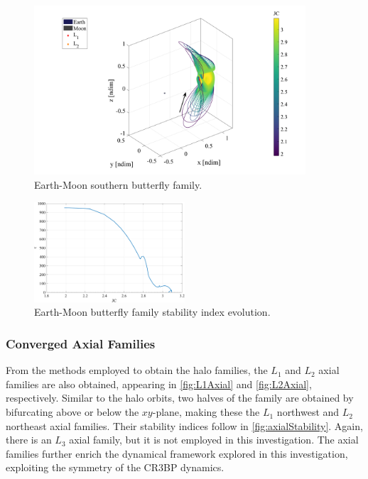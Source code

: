 \begin{figure}[H]
    \centering
    \includegraphics[width=0.9\textwidth]{figures/L2ButterflyFamily.pdf}
    \caption{Earth-Moon southern butterfly family.}
    \label{fig:butterfly}
\end{figure}

\begin{figure}[H]
    \centering
    \includegraphics[width=0.5\textwidth]{figures/L2ButterflyStability.pdf}
    \caption{Earth-Moon butterfly family stability index evolution.}
    \label{fig:butterflyStability}
\end{figure}

\subsubsection{Converged Axial Families}
From the methods employed to obtain the halo families, the $L_{1}$ and $L_{2}$ axial families are
also obtained, appearing in \cref{fig:L1Axial} and \cref{fig:L2Axial}, respectively. Similar to the
halo orbits, two halves of the family are obtained by bifurcating above or below the $xy$-plane,
making these the $L_{1}$ northwest and $L_{2}$ northeast axial families. Their stability indices
follow in \cref{fig:axialStability}. Again, there is an $L_{3}$ axial family, but it is not
employed in this investigation. The axial families further enrich the dynamical framework explored
in this investigation, exploiting the symmetry of the CR3BP dynamics.

